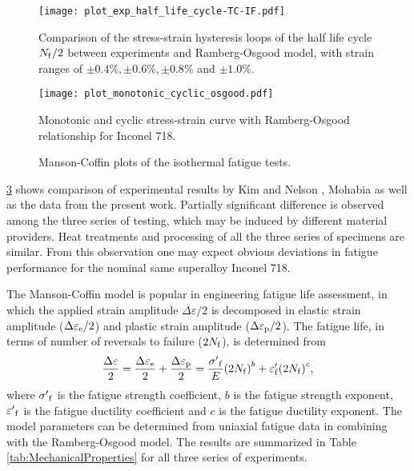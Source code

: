 \begin{figure}[!htp]
  \centering
  \texttt{[image: plot\_exp\_half\_life\_cycle-TC-IF.pdf]}
  \caption{Comparison of the stress-strain hysteresis loops of the half life cycle $N_{\rm f}/2$ between experiments and Ramberg-Osgood model, with strain ranges of $\pm0.4\%, \pm0.6\%, \pm0.8\%$ and $\pm1.0\%$.}
  \label{Fig:plot_exp_half_life_cycle}
\end{figure}

\begin{figure}[!htp]
  \centering
  \texttt{[image: plot\_monotonic\_cyclic\_osgood.pdf]}
  \caption{Monotonic and cyclic stress-strain curve with Ramberg-Osgood relationship for Inconel 718.}
  \label{Fig:plot_monotonic_cyclic_osgood}
\end{figure}

\begin{figure}[!htp]
  \caption{Manson-Coffin plots of the isothermal fatigue tests.}
  \label{Fig:Baseline}
\end{figure}

\ref{Fig:Baseline} shows  comparison of experimental results by Kim \cite{kim1988elevated} and Nelson \cite{nelson1992creep}, Mohabia \cite{Mahobia2014} as well as the data from the present work. Partially significant difference is observed among the three series of testing, which may be induced by different material providers. Heat treatments and processing of all the three series of specimens are similar. From this observation one may expect obvious deviations in fatigue performance for the nominal same superalloy Inconel 718.

The Manson-Coffin model is popular in engineering fatigue life assessment, in which the applied strain amplitude $\Delta \varepsilon/2$ is decomposed in elastic strain amplitude ($\Delta \varepsilon_{\rm e}/2$) and plastic strain amplitude ($\Delta \varepsilon_{\rm p}/2$). The fatigue life, in terms of number of reversals to failure ($2N_{\rm f}$), is determined from
\begin{equation}
\frac{{\Delta \varepsilon }}{2} = \frac{{\Delta {\varepsilon _{\rm e}}}}{2} + \frac{{\Delta {\varepsilon _{\rm p}}}}{2} = \frac{{{{\sigma '}_{\rm f}}}}{E}{\left( {2{N_{\rm f}}} \right)^b} + {\varepsilon '_{\rm f}}{\left( {2{N_{\rm f}}} \right)^c},
\label{Equ:CoffinManson}
\end{equation}
where ${{{\sigma '}_{\rm f}}}$ is the fatigue strength coefficient, $b$ is the fatigue strength exponent, ${{{\varepsilon '}_{\rm f}}}$ is the fatigue ductility coefficient and $c$ is the fatigue ductility exponent. The model parameters can be determined from uniaxial fatigue data in combining with the Ramberg-Osgood model. The results are summarized in Table \ref{tab:MechanicalProperties} for all three series of experiments.


